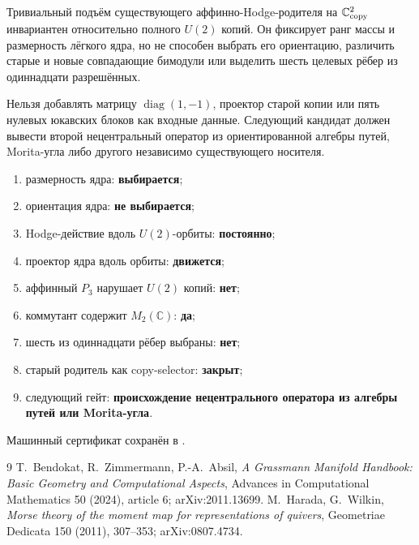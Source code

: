 \begin{theorem}
Тривиальный подъём существующего аффинно-Hodge-родителя на
$\mathbb C^2_{\rm copy}$ инвариантен относительно полного $U(2)$ копий.
Он фиксирует ранг массы и размерность лёгкого ядра, но не способен выбрать
его ориентацию, различить старые и новые совпадающие бимодули или выделить
шесть целевых рёбер из одиннадцати разрешённых.
\end{theorem}

\begin{nogocriterion}
Нельзя добавлять матрицу $\operatorname{diag}(1,-1)$, проектор старой копии
или пять нулевых юкавских блоков как входные данные. Следующий кандидат
должен вывести второй нецентральный оператор из ориентированной алгебры
путей, Morita-угла либо другого независимо существующего носителя.
\end{nogocriterion}

\begin{protocol}
\begin{enumerate}
 \item размерность ядра: \textbf{выбирается};
 \item ориентация ядра: \textbf{не выбирается};
 \item Hodge-действие вдоль $U(2)$-орбиты: \textbf{постоянно};
 \item проектор ядра вдоль орбиты: \textbf{движется};
 \item аффинный $P_3$ нарушает $U(2)$ копий: \textbf{нет};
 \item коммутант содержит $M_2(\mathbb C)$: \textbf{да};
 \item шесть из одиннадцати рёбер выбраны: \textbf{нет};
 \item старый родитель как copy-selector: \textbf{закрыт};
 \item следующий гейт: \textbf{происхождение нецентрального оператора из
 алгебры путей или Morita-угла}.
\end{enumerate}
\end{protocol}

Машинный сертификат сохранён в
.

\begin{thebibliography}{9}
T.~Bendokat, R.~Zimmermann, P.-A.~Absil,
\emph{A Grassmann Manifold Handbook: Basic Geometry and Computational Aspects},
Advances in Computational Mathematics 50 (2024), article 6;
arXiv:2011.13699.
M.~Harada, G.~Wilkin,
\emph{Morse theory of the moment map for representations of quivers},
Geometriae Dedicata 150 (2011), 307--353; arXiv:0807.4734.
\end{thebibliography}
